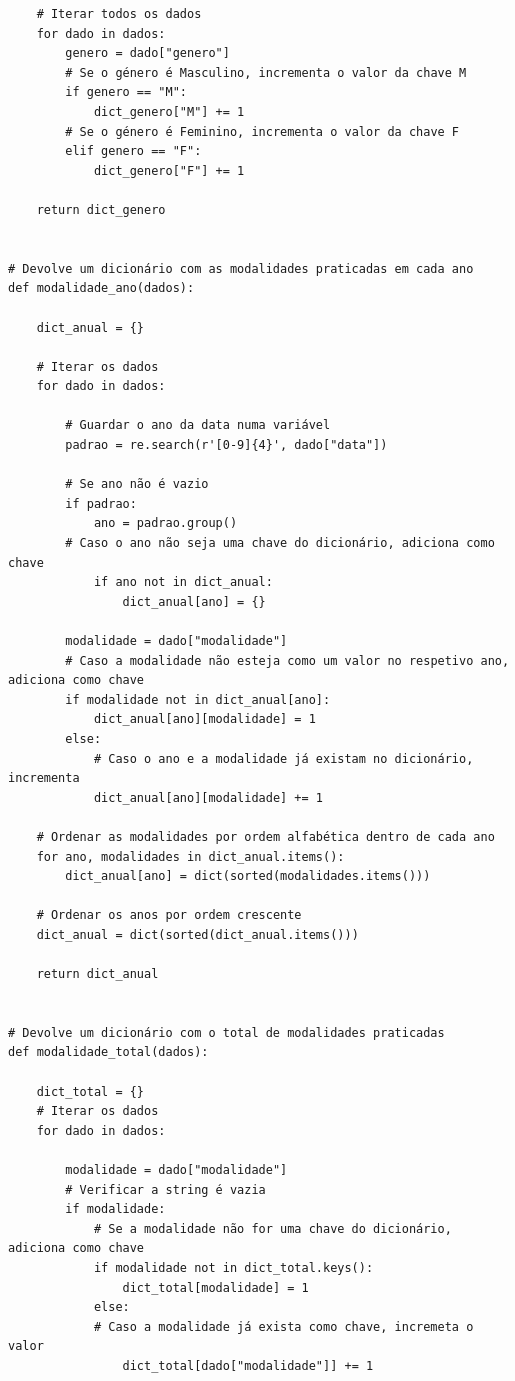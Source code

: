 \documentclass[11pt,a4paper]{report}%
\begin{document}
\begin{verbatim}
    # Iterar todos os dados 
    for dado in dados:
        genero = dado["genero"]
        # Se o género é Masculino, incrementa o valor da chave M
        if genero == "M":
            dict_genero["M"] += 1
        # Se o género é Feminino, incrementa o valor da chave F
        elif genero == "F":
            dict_genero["F"] += 1

    return dict_genero


# Devolve um dicionário com as modalidades praticadas em cada ano
def modalidade_ano(dados):

    dict_anual = {}

    # Iterar os dados
    for dado in dados:
        
        # Guardar o ano da data numa variável
        padrao = re.search(r'[0-9]{4}', dado["data"])

        # Se ano não é vazio
        if padrao:
            ano = padrao.group() 
        # Caso o ano não seja uma chave do dicionário, adiciona como chave
            if ano not in dict_anual:
                dict_anual[ano] = {}
        
        modalidade = dado["modalidade"]
        # Caso a modalidade não esteja como um valor no respetivo ano, adiciona como chave
        if modalidade not in dict_anual[ano]:
            dict_anual[ano][modalidade] = 1
        else:
            # Caso o ano e a modalidade já existam no dicionário, incrementa
            dict_anual[ano][modalidade] += 1

    # Ordenar as modalidades por ordem alfabética dentro de cada ano
    for ano, modalidades in dict_anual.items():
        dict_anual[ano] = dict(sorted(modalidades.items()))
    
    # Ordenar os anos por ordem crescente
    dict_anual = dict(sorted(dict_anual.items()))

    return dict_anual


# Devolve um dicionário com o total de modalidades praticadas
def modalidade_total(dados):

    dict_total = {}
    # Iterar os dados
    for dado in dados:

        modalidade = dado["modalidade"]
        # Verificar a string é vazia
        if modalidade:
            # Se a modalidade não for uma chave do dicionário, adiciona como chave
            if modalidade not in dict_total.keys():
                dict_total[modalidade] = 1
            else:
            # Caso a modalidade já exista como chave, incremeta o valor
                dict_total[dado["modalidade"]] += 1


\end{verbatim}
\end{document}
